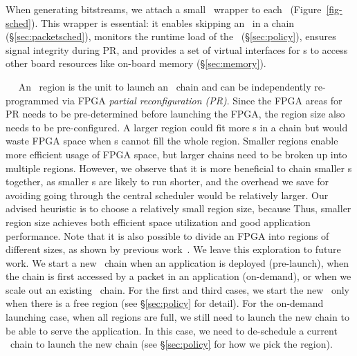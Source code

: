 When generating bitstreams, we attach a small \snic\ wrapper to each \nt\ (Figure~\ref{fig-sched}).
This wrapper is essential: it enables skipping an \nt\ in a chain (\S\ref{sec:packetsched}), monitors the runtime load of the \nt\ (\S\ref{sec:policy}), ensures signal integrity during PR, and provides a set of virtual interfaces for \nt{}s to access other board resources like on-board memory (\S\ref{sec:memory}).

~~
An \nt\ region is the unit to launch an \nt\ chain and can be independently re-programmed via FPGA {\em partial reconfiguration (PR)}.
Since the FPGA areas for PR needs to be pre-determined before launching the FPGA, the region size also needs to be pre-configured.
A larger region could fit more \nt{}s in a chain but would waste FPGA space when \nt{}s cannot fill the whole region.
Smaller regions enable more efficient usage of FPGA space, but larger \nt{} chains need to be broken up into multiple regions.
However, we observe that it is more beneficial to chain smaller \nt{}s together, as smaller \nt{}s are likely to run shorter, and the overhead we save for avoiding going through the central scheduler would be relatively larger.
Our advised heuristic is to choose a relatively small region size, because 
Thus, smaller region size achieves both efficient space utilization and good application performance.
Note that it is also possible to divide an FPGA into regions of different sizes, as shown by previous work~\cite{amorphos-osdi18}. We leave this exploration to future work.
\fi
We start a new \nt\ chain when an application is deployed (pre-launch), when the chain is first accessed by a packet in an application (on-demand), or when we scale out an existing \nt\ chain. For the first and third cases, we start the new \nt\ only when there is a free region (see \S\ref{sec:policy} for detail).
For the on-demand launching case, when all regions are full, we still need to launch the new chain to be able to serve the application. In this case, we need to de-schedule a current \nt\ chain to launch the new chain (see \S\ref{sec:policy} for how we pick the region).

